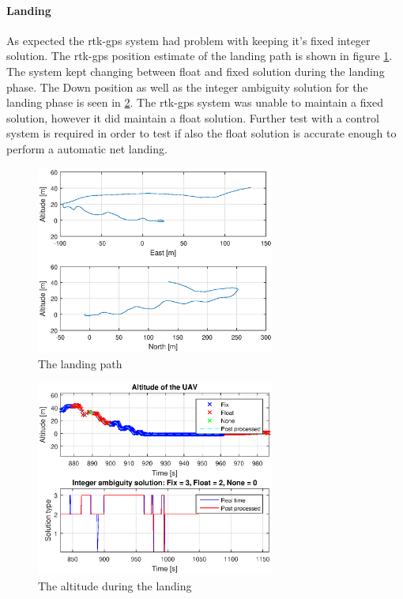 \paragraph{Landing}
As expected the \gls{rtk-gps} system had problem with keeping it's fixed integer solution. The \gls{rtk-gps} position estimate of the landing path is shown in figure \ref{figure:landingPath}. The system kept changing between float and fixed solution during the landing phase. The Down position as well as the integer ambiguity solution for the landing phase is seen in \ref{figure:landingDownFlight}. The \gls{rtk-gps} system was unable to maintain a fixed solution, however it did maintain a float solution. Further test with a control system is required in order to test if also the float solution is accurate enough to perform a automatic net landing.
\begin{figure}[H]
	\centering
		\includegraphics[width=0.7\textwidth]{figs/plots/landingPath.eps}
		\caption{The landing path}
		\label{figure:landingPath}
\end{figure}
\begin{figure}[H]
	\centering
		\includegraphics[width=0.7\textwidth]{figs/plots/landingDownFlight.eps}
		\caption{The altitude during the landing}
		\label{figure:landingDownFlight}
\end{figure}

